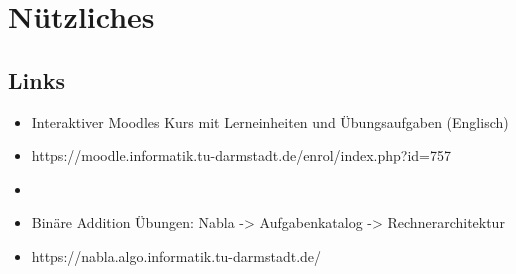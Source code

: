 



\section{Nützliches}
\subsection{Links}
\begin{itemize}
\item Interaktiver Moodles Kurs mit Lerneinheiten und Übungsaufgaben (Englisch)
\item https://moodle.informatik.tu-darmstadt.de/enrol/index.php?id=757
\item[]
\item Binäre Addition Übungen: Nabla -> Aufgabenkatalog -> Rechnerarchitektur
\item https://nabla.algo.informatik.tu-darmstadt.de/
\end{itemize}



